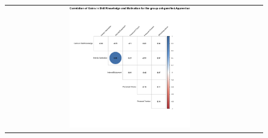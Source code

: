 \begin{figure}[htb]
\begin{tabular}{cc}
 \includegraphics[width=0.5\textwidth]{images/chap-evaluation/corr-signedup-pilot/ont-gamifiedApprentice1.png}
 \end{tabular}
 \fautor
\end{figure}


